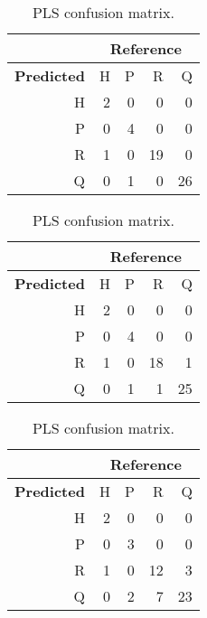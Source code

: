 \documentclass{article}
\begin{document}
\begin{CJK}{UTF8}{gbsn}
\begin{table}[!h]
{{\begin{minipage}[b]{0.5\hsize}
\begin{tabular}{r|rrrr}
				& \multicolumn{4}{c}{\textbf{Reference}} \\
				\midrule
				\textbf{Predicted}  & H & P & R & Q \\ 
				\midrule
				H &   2 &   0 &   0 &   0 \\ 
				P &   0 &   4 &   0 &   0 \\ 
				R &   1 &   0 &  19 &   0 \\ 
				Q &   0 &   1 &   0 &  26 \\
				\bottomrule 
				\end{tabular}
				\caption{PLS-LDA confusion matrix.}
				\label{tab:cmplslda}
				\vskip 1cm
				\begin{tabular}{r|rrrr}
				\toprule
				& \multicolumn{4}{c}{\textbf{Reference}} \\
				\midrule
				\textbf{Predicted}  & H & P & R & Q \\ 
				\midrule
				H &   2 &   0 &   0 &   0 \\ 
				P &   0 &   4 &   0 &   0 \\ 
				R &   1 &   0 &  18 &   1 \\ 
				Q &   0 &   1 &   1 &  25 \\
				\bottomrule 
				\end{tabular}
				\caption{LDA confusion matrix.}
				\label{tab:cmlda}
				\vskip 1cm
				\begin{tabular}{r|rrrr}
				\toprule
				& \multicolumn{4}{c}{\textbf{Reference}} \\
				\midrule
				\textbf{Predicted}  & H & P & R & Q \\ 
				\midrule
				H &   2 &   0 &   0 &   0 \\ 
				P &   0 &   3 &   0 &   0 \\ 
				R &   1 &   0 &  12 &   3 \\ 
				Q &   0 &   2 &   7 &  23 \\ 
				\bottomrule 
				\end{tabular}
				\caption{PLS confusion matrix.}
				\label{tab:cmpls}
				\end{minipage}
				\hfil
			}}
			\end{table}

		
	\end{CJK}
\end{document}
